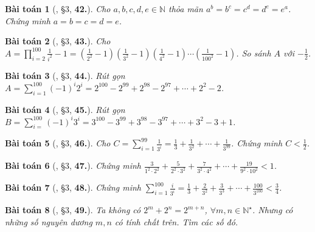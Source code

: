 \documentclass{article}
\numberwithin{equation}{section}
\newtheorem{baitoan}{Bài toán}[section]
\begin{document}
\begin{baitoan}[\cite{Binh_Toan_7_tap_1}, \S3, \textbf{42.}]
	Cho $a,b,c,d,e\in\mathbb{N}$ thỏa mãn $a^b = b^c = c^d = d^e = e^a$. Chứng minh $a = b = c = d = e$.
\end{baitoan}

\begin{baitoan}[\cite{Binh_Toan_7_tap_1}, \S3, \textbf{43.}]
	Cho $A = \prod_{i=2}^{100} \frac{1}{i^2} - 1 = \left(\frac{1}{2^2} - 1\right)\left(\frac{1}{3^2} - 1\right)\left(\frac{1}{4^2} - 1\right)\cdots\left(\frac{1}{100^2} - 1\right)$. So sánh $A$ với $-\frac{1}{2}$.
\end{baitoan}

\begin{baitoan}[\cite{Binh_Toan_7_tap_1}, \S3, \textbf{44.}]
	Rút gọn $A = \sum_{i=1}^{100} (-1)^i2^i = 2^{100} - 2^{99} + 2^{98} - 2^{97} + \cdots + 2^2 - 2$.
\end{baitoan}

\begin{baitoan}[\cite{Binh_Toan_7_tap_1}, \S3, \textbf{45.}]
	Rút gọn $B = \sum_{i=
	}^{100} (-1)^i3^i = 3^{100} - 3^{99} + 3^{98} - 3^{97} + \cdots + 3^2 - 3 + 1$.
\end{baitoan}

\begin{baitoan}[\cite{Binh_Toan_7_tap_1}, \S3, \textbf{46.}]
	Cho $C = \sum_{i=1}^{99} \frac{1}{3^i} = \frac{1}{3} + \frac{1}{3^2} + \cdots + \frac{1}{3^{99}}$. Chứng minh $C < \frac{1}{2}$.
\end{baitoan}

\begin{baitoan}[\cite{Binh_Toan_7_tap_1}, \S3, \textbf{47.}]
	Chứng minh $\frac{3}{1^2\cdot 2^2} + \frac{5}{2^2\cdot 3^2} + \frac{7}{3^2\cdot 4^2} + \cdots + \frac{19}{9^2\cdot 10^2} < 1$.
\end{baitoan}

\begin{baitoan}[\cite{Binh_Toan_7_tap_1}, \S3, \textbf{48.}]
	Chứng minh $\sum_{i=1}^{100} \frac{i}{3^i} = \frac{1}{3} + \frac{2}{3^2} + \frac{3}{3^3} + \cdots + \frac{100}{3^{100}} < \frac{3}{4}$.
\end{baitoan}

\begin{baitoan}[\cite{Binh_Toan_7_tap_1}, \S3, \textbf{49.}]
	Ta không có $2^m + 2^n = 2^{m+n}$, $\forall m,n\in\mathbb{N}^\star$. Nhưng có những số nguyên dương $m,n$ có tính chất trên. Tìm các số đó.
\end{baitoan}
\end{document}
